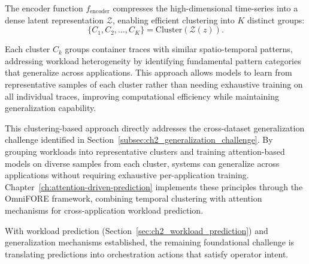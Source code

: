 The encoder function $f_{\text{encoder}}$ compresses the high-dimensional time-series into a dense latent representation $\mathcal{Z}$, enabling efficient clustering into $K$ distinct groups:
\[
\{C_1, C_2, \ldots, C_K\} = \text{Cluster}(\mathcal{Z}(z)).
\]

Each cluster $C_k$ groups container traces with similar spatio-temporal patterns, addressing workload heterogeneity by identifying fundamental pattern categories that generalize across applications. This approach allows models to learn from representative samples of each cluster rather than needing exhaustive training on all individual traces, improving computational efficiency while maintaining generalization capability.

This clustering-based approach directly addresses the cross-dataset generalization challenge identified in Section~\ref{subsec:ch2_generalization_challenge}. By grouping workloads into representative clusters and training attention-based models on diverse samples from each cluster, systems can generalize across applications without requiring exhaustive per-application training. Chapter~\ref{ch:attention-driven-prediction} implements these principles through the \ac{OmniFORE} framework, combining temporal clustering with attention mechanisms for cross-application workload prediction.

With workload prediction (Section~\ref{sec:ch2_workload_prediction}) and generalization mechanisms established, the remaining foundational challenge is translating predictions into orchestration actions that satisfy operator intent.
